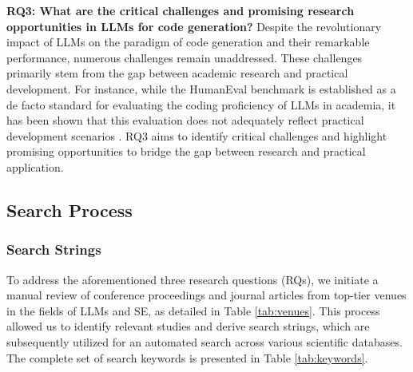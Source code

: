 \textbf{RQ3: What are the critical challenges and promising research opportunities in LLMs for code generation?}
Despite the revolutionary impact of LLMs on the paradigm of code generation and their remarkable performance, numerous challenges remain unaddressed. 
These challenges primarily stem from the gap between academic research and practical development. 
For instance, while the HumanEval benchmark is established as a de facto standard for evaluating the coding proficiency of LLMs in academia, it has been shown that this evaluation does not adequately reflect practical development scenarios \cite{jimenez2023swe,du2024evaluating,liu2024your,ding2024crosscodeeval}. 
RQ3 aims to identify critical challenges and highlight promising opportunities to bridge the gap between research and practical application.


\subsection{Search Process}



\subsubsection{Search Strings}
To address the aforementioned three research questions (RQs), we initiate a manual review of conference proceedings and journal articles from top-tier venues in the fields of LLMs and SE, as detailed in Table \ref{tab:venues}. 
This process allowed us to identify relevant studies and derive search strings, which are subsequently utilized for an automated search across various scientific databases. The complete set of search keywords is presented in Table \ref{tab:keywords}.

